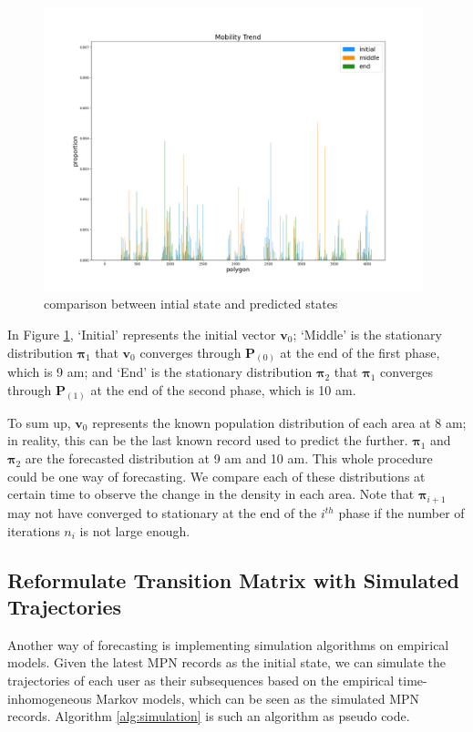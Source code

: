 \documentclass[12pt]{article}
\theoremstyle{definition}
\begin{document}
\begin{figure}
  \centering
  \includegraphics[width=11cm]{SD.png}
  \caption{comparison between intial state and predicted states}
  \label{fig:mob_trend}
\end{figure}


In Figure \ref{fig:mob_trend}, ‘Initial’ represents the initial vector \(\boldsymbol{v}_{0}\); ‘Middle’ is the stationary distribution \(\boldsymbol{\pi}_{1}\) that \(\boldsymbol{v}_{0}\) converges through \(\textbf{P}_{(0)}\) at the end of the first phase, which is 9 am; and ‘End’ is the stationary distribution \(\boldsymbol{\pi}_{2}\) that \(\boldsymbol{\pi}_{1}\) converges through \(\textbf{P}_{(1)}\) at the end of the second phase, which is 10 am. 

To sum up, \(\boldsymbol{v}_{0}\) represents the known population distribution of each area at 8 am; in reality, this can be the last known record used to predict the further. \(\boldsymbol{\pi}_{1}\) and \(\boldsymbol{\pi}_{2}\) are the forecasted distribution at 9 am and 10 am. This whole procedure could be one way of forecasting. We compare each of these distributions at certain time to observe the change in the density in each area. Note that \(\boldsymbol{\pi}_{i+1}\) may not have converged to stationary at the end of the \(i^{th}\) phase if the number of iterations \(n_{i}\) is not large enough.


\subsection{Reformulate Transition Matrix with Simulated Trajectories}
Another way of forecasting is implementing simulation algorithms on empirical models. Given the latest MPN records as the initial state, we can simulate the trajectories of each user as their subsequences based on the empirical time-inhomogeneous Markov models, which can be seen as the simulated MPN records. Algorithm \ref{alg:simulation} is such an algorithm as pseudo code.
\end{document}
